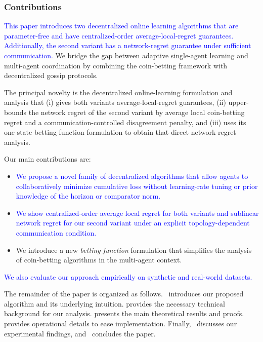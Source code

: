 \documentclass[journal]{IEEEtran}
\begin{document}
\subsubsection*{Contributions}
\textcolor{blue}{This paper introduces two decentralized online learning algorithms that are parameter-free and have centralized-order average-local-regret guarantees.
    Additionally, the second variant has a network-regret guarantee under sufficient communication.}
We bridge the gap between adaptive single-agent learning and multi-agent coordination by combining the coin-betting framework with decentralized gossip protocols.
    {\color{blue}
        The principal novelty is the decentralized online-learning formulation and analysis that (i) gives both variants average-local-regret guarantees, (ii) upper-bounds the network regret of the second variant by average local coin-betting regret and a communication-controlled disagreement penalty, and (iii) uses its one-state betting-function formulation to obtain that direct network-regret analysis.
        \par}

Our main contributions are:
\begin{itemize}
    \item \textcolor{blue}{We propose a novel family of decentralized algorithms that allow agents to collaboratively minimize cumulative loss without learning-rate tuning or prior knowledge of the horizon or comparator norm.}
    \item \textcolor{blue}{We show centralized-order average local regret for both variants and sublinear network regret for our second variant under an explicit topology-dependent communication condition.}
    \item We introduce a new \emph{betting function} formulation that simplifies the analysis of coin-betting algorithms in the multi-agent context.
\end{itemize}
\textcolor{blue}{We also evaluate our approach empirically on synthetic and real-world datasets.}

The remainder of the paper is organized as follows.~ introduces our proposed algorithm and its underlying intuition.
 provides the necessary technical background for our analysis.
 presents the main theoretical results and proofs.
 provides operational details to ease implementation.
Finally,~ discusses our experimental findings, and~ concludes the paper.
\end{document}
